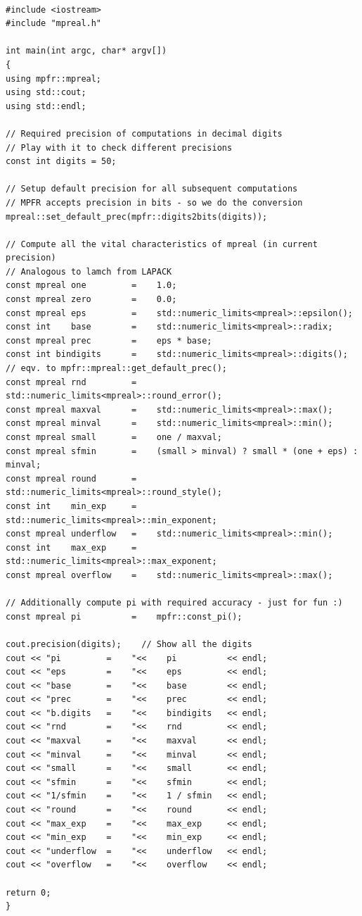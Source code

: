 \begin{lstlisting}

#include <iostream>
#include "mpreal.h"

int main(int argc, char* argv[])
{
using mpfr::mpreal;    
using std::cout;
using std::endl;

// Required precision of computations in decimal digits
// Play with it to check different precisions
const int digits = 50; 

// Setup default precision for all subsequent computations
// MPFR accepts precision in bits - so we do the conversion 
mpreal::set_default_prec(mpfr::digits2bits(digits));

// Compute all the vital characteristics of mpreal (in current precision)
// Analogous to lamch from LAPACK
const mpreal one         =    1.0;
const mpreal zero        =    0.0;
const mpreal eps         =    std::numeric_limits<mpreal>::epsilon();
const int    base        =    std::numeric_limits<mpreal>::radix;
const mpreal prec        =    eps * base;
const int bindigits      =    std::numeric_limits<mpreal>::digits(); // eqv. to mpfr::mpreal::get_default_prec();
const mpreal rnd         =    std::numeric_limits<mpreal>::round_error();
const mpreal maxval      =    std::numeric_limits<mpreal>::max();
const mpreal minval      =    std::numeric_limits<mpreal>::min();
const mpreal small       =    one / maxval;
const mpreal sfmin       =    (small > minval) ? small * (one + eps) : minval;
const mpreal round       =    std::numeric_limits<mpreal>::round_style();
const int    min_exp     =    std::numeric_limits<mpreal>::min_exponent;
const mpreal underflow   =    std::numeric_limits<mpreal>::min();
const int    max_exp     =    std::numeric_limits<mpreal>::max_exponent;
const mpreal overflow    =    std::numeric_limits<mpreal>::max();

// Additionally compute pi with required accuracy - just for fun :)
const mpreal pi          =    mpfr::const_pi();

cout.precision(digits);    // Show all the digits
cout << "pi         =    "<<    pi          << endl;    
cout << "eps        =    "<<    eps         << endl;
cout << "base       =    "<<    base        << endl;
cout << "prec       =    "<<    prec        << endl;
cout << "b.digits   =    "<<    bindigits   << endl;
cout << "rnd        =    "<<    rnd         << endl;
cout << "maxval     =    "<<    maxval      << endl;    
cout << "minval     =    "<<    minval      << endl;    
cout << "small      =    "<<    small       << endl;    
cout << "sfmin      =    "<<    sfmin       << endl;    
cout << "1/sfmin    =    "<<    1 / sfmin   << endl;    
cout << "round      =    "<<    round       << endl;    
cout << "max_exp    =    "<<    max_exp     << endl;
cout << "min_exp    =    "<<    min_exp     << endl;
cout << "underflow  =    "<<    underflow   << endl;    
cout << "overflow   =    "<<    overflow    << endl;

return 0;
}

\end{lstlisting}




